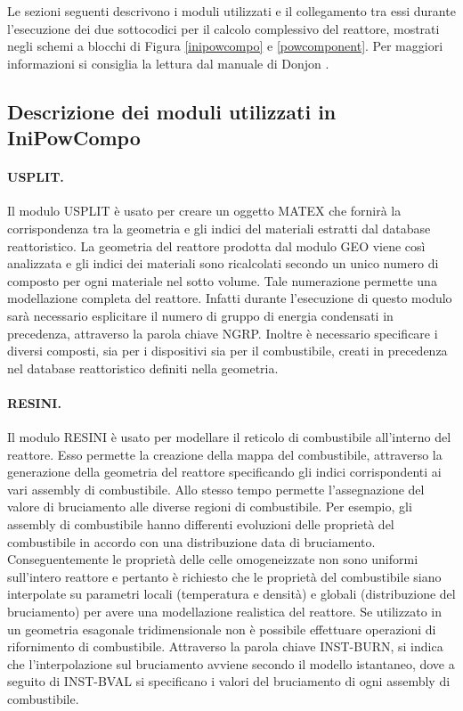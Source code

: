 Le sezioni seguenti descrivono i moduli utilizzati e 
il collegamento tra essi durante l'esecuzione dei due 
sottocodici per il calcolo complessivo del reattore, mostrati
negli schemi a blocchi di Figura \ref{inipowcompo} e \ref{powcomponent}. 
Per maggiori informazioni si consiglia la lettura dal manuale di Donjon \cite{donjonman}.

\subsection{Descrizione dei moduli utilizzati in IniPowCompo}

\paragraph{USPLIT.}
Il modulo USPLIT è usato per creare un oggetto MATEX che fornirà la 
corrispondenza tra la geometria e gli indici del materiali estratti dal 
database 
reattoristico.
La geometria del reattore prodotta dal modulo GEO viene così analizzata e gli indici 
dei 
materiali sono ricalcolati secondo un unico numero di composto per ogni 
materiale nel sotto volume.
Tale numerazione permette una modellazione completa del reattore.
Infatti durante l'esecuzione di questo modulo sarà necessario esplicitare il 
numero di gruppo di energia condensati in precedenza, attraverso la parola 
chiave NGRP. 
Inoltre è necessario specificare i diversi composti, sia per i dispositivi sia 
per il combustibile, creati in precedenza nel database reattoristico definiti 
nella geometria.
\paragraph{RESINI.}
Il modulo RESINI è usato per modellare il reticolo di combustibile all'interno 
del reattore.
Esso permette la creazione della mappa del combustibile, attraverso la 
generazione della geometria del reattore specificando gli indici corrispondenti 
ai vari assembly di combustibile. Allo stesso tempo permette l'assegnazione del 
valore di bruciamento alle diverse regioni di combustibile.
Per esempio, gli assembly di combustibile hanno differenti evoluzioni delle 
proprietà del combustibile in accordo con una distribuzione data di bruciamento.
Conseguentemente le proprietà delle celle omogeneizzate non sono uniformi
sull'intero reattore e pertanto è richiesto che le proprietà del combustibile 
siano interpolate su parametri locali (temperatura e densità) e globali 
(distribuzione del bruciamento) per avere una modellazione realistica del 
reattore.
Se utilizzato in un geometria esagonale tridimensionale non è possibile 
effettuare operazioni di rifornimento di combustibile.
Attraverso la parola chiave INST-BURN, si indica che l'interpolazione sul 
bruciamento avviene secondo il modello istantaneo, dove a seguito di INST-BVAL 
si specificano i valori del bruciamento di ogni assembly di combustibile.

